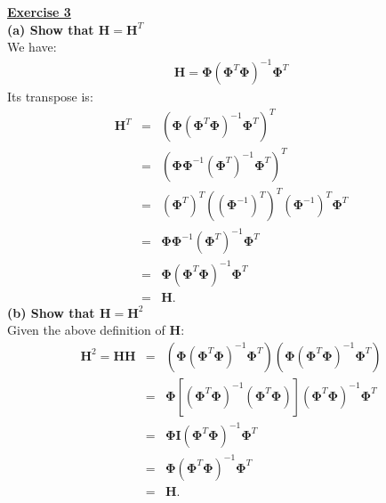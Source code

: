 \documentclass[a4paper, 11pt]{article}
\begin{document}
\newline \textbf{\underline{Exercise 3}}\\
\newline \textbf{(a) Show that $\mathbf{H} = \mathbf{H}^T$}\\
\newline We have:
\begin{eqnarray}
\mathbf{H} = \mathbf{\Phi} \left( \mathbf{\Phi}^T \mathbf{\Phi} \right)^{-1} \mathbf{\Phi}^T \nonumber
\end{eqnarray}
Its transpose is:
\begin{eqnarray}
\mathbf{H}^T &=& \left( \mathbf{\Phi} \left( \mathbf{\Phi}^T \mathbf{\Phi} \right)^{-1} \mathbf{\Phi}^T \right)^T \nonumber \\
&=& \left( \mathbf{\Phi} \mathbf{\Phi}^{-1} \left( \mathbf{\Phi}^T\right)^{-1}  \mathbf{\Phi}^T \right)^T \nonumber \\
&=& \left( \mathbf{\Phi}^T \right)^T \left( \left( \mathbf{\Phi}^{-1} \right)^T \right)^T \left( \mathbf{\Phi}^{-1} \right)^T \mathbf{\Phi}^T \nonumber \\
&=&\mathbf{\Phi} \mathbf{\Phi}^{-1} \left( \mathbf{\Phi}^T \right)^{-1} \mathbf{\Phi}^T \nonumber \\
&=& \mathbf{\Phi} \left( \mathbf{\Phi}^T \mathbf{\Phi} \right)^{-1} \mathbf{\Phi}^T \nonumber \\
&=& \mathbf{H}. \nonumber
\end{eqnarray}
\textbf{(b) Show that $\mathbf{H} = \mathbf{H}^2$}\\
\newline Given the above definition of $\mathbf{H}$:
\begin{eqnarray}
\mathbf{H}^2 = \mathbf{H} \mathbf{H} &=& \left( \mathbf{\Phi} \left( \mathbf{\Phi}^T \mathbf{\Phi} \right)^{-1} \mathbf{\Phi}^T \right) \left( \mathbf{\Phi} \left( \mathbf{\Phi}^T \mathbf{\Phi} \right)^{-1} \mathbf{\Phi}^T \right) \nonumber \\
&=& \mathbf{\Phi} \left[ \left( \mathbf{\Phi}^T \mathbf{\Phi} \right)^{-1} \left( \mathbf{\Phi}^T \mathbf{\Phi} \right) \right] \left( \mathbf{\Phi}^T \mathbf{\Phi} \right)^{-1} \mathbf{\Phi}^T \nonumber \\
&=& \mathbf{\Phi} \mathbf{I} \left( \mathbf{\Phi}^T \mathbf{\Phi} \right)^{-1} \mathbf{\Phi}^T \nonumber \\
&=& \mathbf{\Phi} \left( \mathbf{\Phi}^T \mathbf{\Phi} \right)^{-1} \mathbf{\Phi}^T \nonumber \\
&=& \mathbf{H}.  \nonumber
\end{eqnarray}
\end{document}
